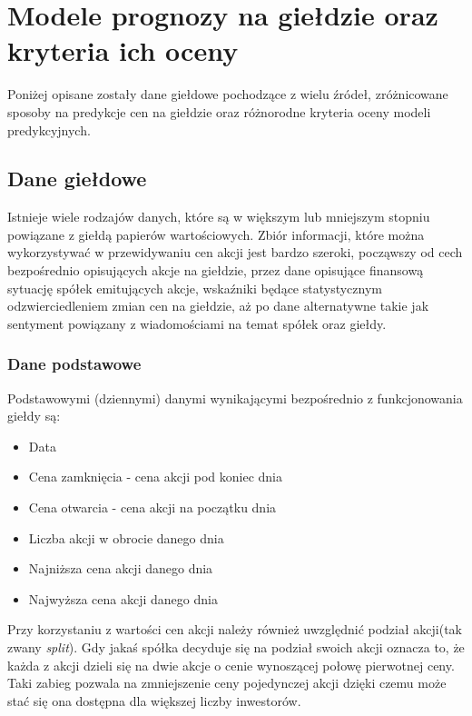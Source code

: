 \documentclass[a4paper, twoside, 11pt, openright]{article}
\begin{document}
\bigskip



\section{Modele prognozy na giełdzie oraz kryteria ich oceny}

Poniżej opisane zostały dane giełdowe pochodzące z wielu źródeł, zróżnicowane sposoby na predykcje cen na giełdzie oraz różnorodne kryteria oceny modeli predykcyjnych. 

\subsection{Dane giełdowe}

Istnieje wiele rodzajów danych, które są w większym lub mniejszym stopniu powiązane z giełdą papierów wartościowych. Zbiór informacji, które można wykorzystywać w przewidywaniu cen akcji jest bardzo szeroki, począwszy od cech bezpośrednio opisujących akcje na giełdzie, przez dane opisujące finansową sytuację spółek emitujących akcje, wskaźniki będące statystycznym odzwierciedleniem zmian cen na giełdzie, aż po dane alternatywne takie jak sentyment powiązany z wiadomościami na temat spółek oraz giełdy.

\subsubsection{Dane podstawowe}

Podstawowymi (dziennymi) danymi wynikającymi bezpośrednio z funkcjonowania giełdy są:

\begin{itemize}
\item{Data}
\item{Cena zamknięcia} - cena akcji pod koniec dnia
\item{Cena otwarcia} - cena akcji na początku dnia
\item{Liczba akcji w obrocie danego dnia}
\item{Najniższa cena akcji danego dnia}
\item{Najwyższa cena akcji danego dnia}
\end{itemize}

 Przy korzystaniu z wartości cen akcji należy również uwzględnić podział akcji(tak zwany \textit{split}). Gdy jakaś spółka decyduje się na podział swoich akcji oznacza to, że każda z akcji dzieli się na dwie akcje o cenie wynoszącej połowę pierwotnej ceny. Taki zabieg pozwala na zmniejszenie ceny pojedynczej akcji dzięki czemu może stać się ona dostępna dla większej liczby inwestorów. 
 
\end{document}

